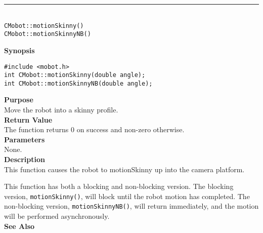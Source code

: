 \noindent
\vspace{5pt}
\rule{4.5in}{0.015in}\\
\noindent
{\LARGE \texttt{CMobot::motionSkinny()}}\\
{\LARGE \texttt{CMobot::motionSkinnyNB()}}\\
{}

\noindent
{\bf Synopsis}
\vspace{-8pt}
\begin{verbatim}
#include <mobot.h>
int CMobot::motionSkinny(double angle);
int CMobot::motionSkinnyNB(double angle);
\end{verbatim}

\noindent
{\bf Purpose}\\
Move the robot into a skinny profile.\\

\noindent
{\bf Return Value}\\
The function returns 0 on success and non-zero otherwise.\\

\noindent
{\bf Parameters}\\
None.\\

\noindent
{\bf Description}\\
This function causes the robot to motionSkinny up into the camera platform.

This function has both a blocking and non-blocking version.
The blocking version, \texttt{motionSkinny()}, will block until the
robot motion has completed. The non-blocking version, \texttt{motionSkinnyNB()},
will return immediately, and the motion will be performed asynchronously.\\

\noindent
{\bf See Also}\\

